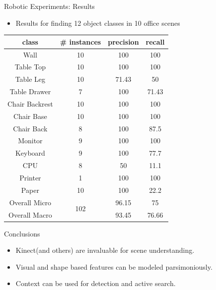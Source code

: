 \documentclass{beamer}
\begin{document}
\begin{frame}{Robotic Experiments: Results}

\begin{itemize}

\item Results for finding 12 object classes in 10 office scenes

\end{itemize}

\begin {center}
{\footnotesize 
\begin{tabular}{c | c | c | c}
class & \# instances & precision & recall \\
\hline
Wall & 10 & 100 & 100 \\
Table Top & 10 & 100  &100  \\
Table Leg & 10 & 71.43 & 50  \\
Table Drawer & 7 & 100 & 71.43 \\
Chair Backrest & 10 & 100 & 100  \\
Chair Base & 10 & 100  & 100 \\
Chair Back & 8 & 100 & 87.5 \\
Monitor & 9  & 100 & 100 \\
Keyboard & 9 & 100 & 77.7 \\
CPU & 8 & 50 & 11.1 \\ 
Printer & 1 & 100 & 100 \\
Paper & 10 & 100 & 22.2 \\
\hline
Overall Micro & \multirow{2}{*}{102} & 96.15 & 75 \\
Overall Macro & & 93.45 & 76.66 \\

\end{tabular}
}
\end{center}

\end{frame}

\begin{frame}{Conclusions}
\begin{itemize}
\item Kinect(and others) are invaluable for scene understanding.
\item Visual and shape based features can be modeled parsimoniously.
\item Context can be used for detection and active search.
\end{itemize}

\end{frame}
\end{document}
